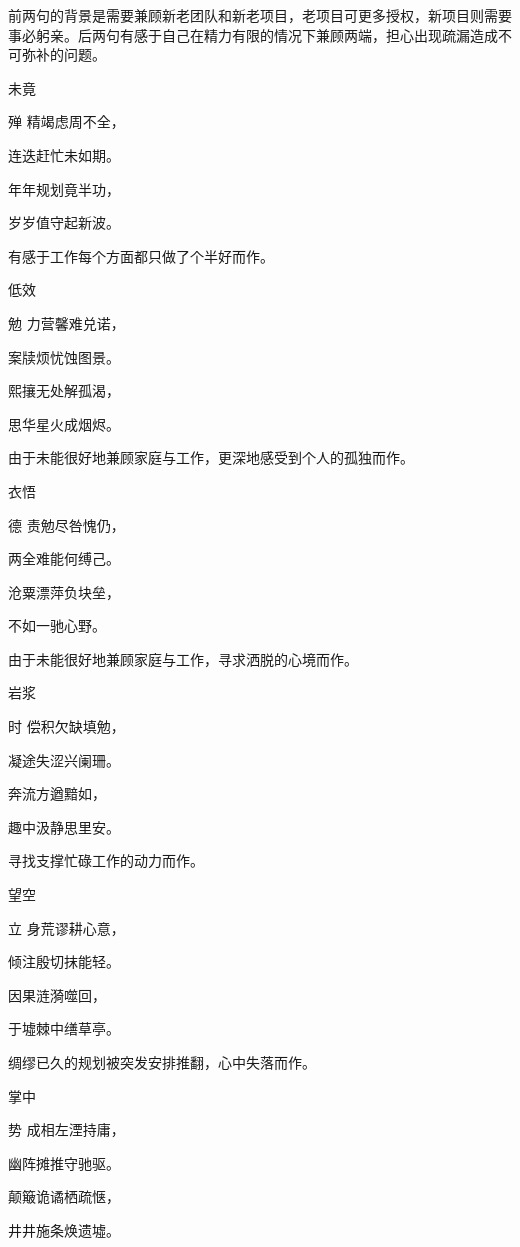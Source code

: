 \documentclass{article}
\newenvironment{poem}[3]{
\begin{minipage}{\textwidth}
\begin{pinyinscope}\begin{center}\Large\linespread{1.4}\selectfont #2\end{center}\end{pinyinscope}
\begin{pinyinscope}
	\begin{center}
	\Large\linespread{1.4}\rmfamily\selectfont #3
}{\end{center}
\end{pinyinscope}
\end{minipage}
}
\begin{document}
前两句的背景是需要兼顾新老团队和新老项目，老项目可更多授权，新项目则需要事必躬亲。后两句有感于自己在精力有限的情况下兼顾两端，担心出现疏漏造成不可弥补的问题。

\begin{poem}{}{未竟}
殚精竭虑周不全，

连迭赶忙未如期。

年年规划竟半功，

岁岁值守起新波。
\end{poem}

有感于工作每个方面都只做了个半好而作。

\begin{poem}{}{低效}
勉力营馨难兑诺，

案牍烦忧蚀图景。

熙攘无处解孤渴，

思华星火成烟烬。
\end{poem}

由于未能很好地兼顾家庭与工作，更深地感受到个人的孤独而作。

\begin{poem}{}{衣悟}
德责勉尽咎愧仍，

两全难能何缚己。

沧粟漂萍负块垒，

不如一{}驰心野。
\end{poem}

由于未能很好地兼顾家庭与工作，寻求洒脱的心境而作。

\begin{poem}{}{岩浆}
时偿积欠缺填勉，

凝途失涩兴阑珊。

奔流方遒黯如{}，

趣中汲静思里安。
\end{poem}

寻找支撑忙碌工作的动力而作。

\begin{poem}{}{望空}
立身荒谬耕心意，

倾注殷切抹能轻。

因果涟漪噬回{}，

于墟棘中缮草亭。
\end{poem}

绸缪已久的规划被突发安排推翻，心中失落而作。

\begin{poem}{}{掌中}
势成相左湮持庸，

幽阵摊推守驰驱。

颠簸诡谲栖疏惬，

井井施条焕遗墟。
\end{poem}
\end{document}
